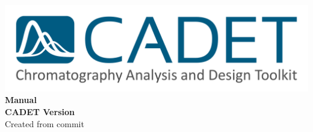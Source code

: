 \documentclass[%
paper=A4, %
pagesize, %
DIV=14,
fontsize=10pt,
headsepline,
titlepage,
twoside,
bibtotoc,
final     %
]{scrartcl}
\begin{document}
\begin{titlepage}
	\begin{center}
		\includegraphics[width=0.6\linewidth]{../logo/CADET-Logo} \\
		\vspace{8cm}
		{\Huge\textbf{Manual}}\\
		\vspace{9cm}
		\textbf{CADET Version }\\
		\vspace{0.8cm}
		{\footnotesize Created from commit }
	\end{center}
\end{titlepage}

\tableofcontents

\newpage
\listoffigures

\newpage
\listoftables

\newpage
{}
\setcounter{page}{1}



\end{document}
